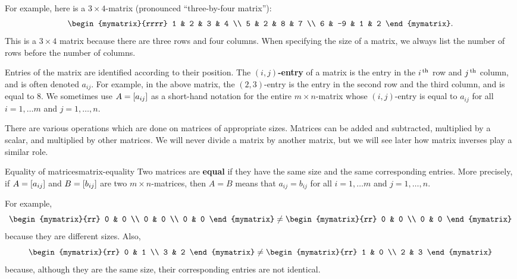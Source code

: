 For example, here is a $3\times 4$-matrix (pronounced ``three-by-four
matrix''):
\begin{equation*}
  \begin{mymatrix}{rrrr}
    1 & 2 & 3 & 4 \\
    5 & 2 & 8 & 7 \\
    6 & -9 & 1 & 2
  \end{mymatrix}.
\end{equation*}
This is a $3\times 4$ matrix because there are three rows and four
columns. When specifying the size of a matrix, we always list the
number of rows before the number of columns.

Entries of the matrix are identified according to their position. The
\textbf{$(i,j)$-entry}%
 of a matrix is
the entry in the $i^{\,\rm th}$ row and $j^{\,\rm th}$ column, and is often denoted
$a_{ij}$. For example, in the above matrix, the $(2,3)$-entry is the
entry in the second row and the third column, and is equal to $8$. We
sometimes use $A=\left[a_{ij}\right]$ as a short-hand notation for the entire
$m\times n$-matrix whose $(i,j)$-entry is equal to $a_{ij}$ for all
$i=1,\ldots m$ and $j=1,\ldots,n$.

There are various operations which are done on matrices of appropriate
sizes. Matrices can be added and subtracted, multiplied by a scalar,
and multiplied by other matrices. We will never divide a matrix by
another matrix, but we will see later how matrix inverses play a
similar role.

\begin{definition}{Equality of matrices}{matrix-equality}
  Two matrices are \textbf{equal}%
   if they have the same size and the same
  corresponding entries. More precisely, if $A=\left[a_{ij}\right]$ and
  $B=\left[b_{ij}\right]$ are two $m\times n$-matrices, then $A=B$ means that
  $a_{ij}=b_{ij}$ for all $i=1,\ldots m$ and $j=1,\ldots,n$.
\end{definition}

For example,
\begin{equation*}
\begin{mymatrix}{rr}
0 & 0 \\
0 & 0 \\
0 & 0
\end{mymatrix} \neq \begin{mymatrix}{rr}
0 & 0 \\
0 & 0
\end{mymatrix}
\end{equation*}
because they are different sizes.
Also,
\begin{equation*}
\begin{mymatrix}{rr}
0 & 1 \\
3 & 2
\end{mymatrix} \neq \begin{mymatrix}{rr}
1 & 0 \\
2 & 3
\end{mymatrix}
\end{equation*}
because, although they are the same size, their corresponding entries are not identical.

